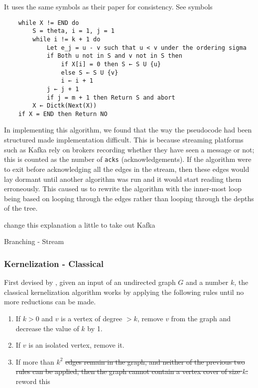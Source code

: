 It uses the same symbols as their paper for consistency. See symbols

\begin{verbatim}
    while X != END do
        S = theta, i = 1, j = 1
        while i != k + 1 do
            Let e_j = u - v such that u < v under the ordering sigma
            if Both u not in S and v not in S then
                if X[i] = 0 then S ← S U {u}
                else S ← S U {v}
                i ← i + 1
            j ← j + 1
            if j = m + 1 then Return S and abort
        X ← Dictk(Next(X))
    if X = END then Return NO
\end{verbatim}

In implementing this algorithm, we found that the way the pseudocode had been
structured made implementation difficult. This is because streaming platforms
such as Kafka rely on brokers recording whether they have seen a message or
not; this is counted as the number of \texttt{acks} (acknowledgements). If the
algorithm were to exit before acknowledging all the edges in the stream, then
these edges would lay dormant until another algorithm was run and it would
start reading them erroneously. This caused us to rewrite the algorithm with
the inner-most loop being based on looping through the edges rather than
looping through the depths of the tree.

change this explanation a little to take out Kafka

\begin{algorithm}[H]
    \caption{Branching - Stream}
    \DontPrintSemicolon {}
\end{algorithm}

\subsubsection{Kernelization - Classical}

First devised by \cite{buss1991nondeterminism}, given an input of an undirected
graph \(G\) and a number \(k\), the classical kernelization algorithm works by
applying the following rules until no more reductions can be made.

\begin{enumerate}
    \item
          If \(k > 0\) and \(v\) is a vertex of degree \(> k\), remove \(v\)
          from the graph and decrease the value of \(k\) by 1.
    \item
          If \(v\) is an isolated vertex, remove it.
    \item
          If more than \(k^2\) \sout{edges remain in the graph, and neither of
              the previous two rules can be applied, then the graph cannot
              contain a vertex cover of size \(k\).} reword this
\end{enumerate}

